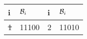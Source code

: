\begin{tabular}{|l|l||l|l|}
\hline
 i & $\mathcal{B}_i$  &  i & $\mathcal{B}_i$ \\\hline
\hline
\sout{1} &11100 &
{2} &11010 \\
\hline
\end{tabular}


